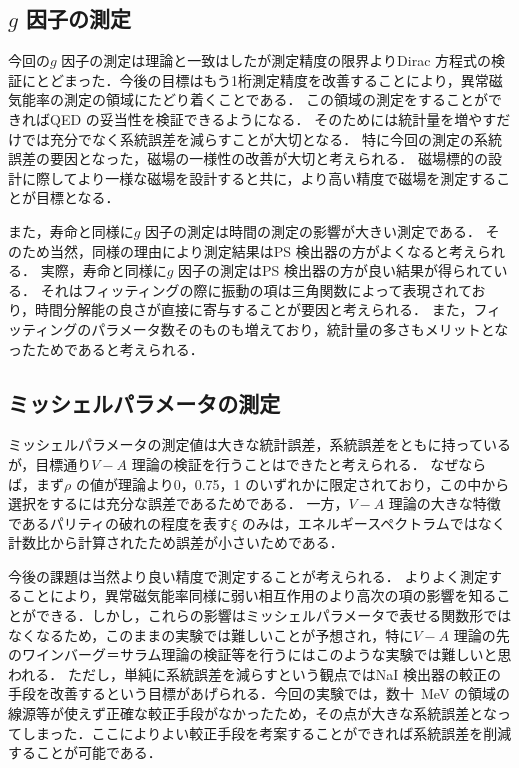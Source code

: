 \subsection{$g$ 因子の測定}
今回の$g$ 因子の測定は理論と一致はしたが測定精度の限界よりDirac 方程式の検証にとどまった．今後の目標はもう1桁測定精度を改善することにより，異常磁気能率の測定の領域にたどり着くことである．
この領域の測定をすることができればQED の妥当性を検証できるようになる．
そのためには統計量を増やすだけでは充分でなく系統誤差を減らすことが大切となる．
特に今回の測定の系統誤差の要因となった，磁場の一様性の改善が大切と考えられる．
磁場標的の設計に際してより一様な磁場を設計すると共に，より高い精度で磁場を測定することが目標となる．

また，寿命と同様に$g$ 因子の測定は時間の測定の影響が大きい測定である．
そのため当然，同様の理由により測定結果はPS 検出器の方がよくなると考えられる．
実際，寿命と同様に$g$ 因子の測定はPS 検出器の方が良い結果が得られている．
それはフィッティングの際に振動の項は三角関数によって表現されており，時間分解能の良さが直接に寄与することが要因と考えられる．
また，フィッティングのパラメータ数そのものも増えており，統計量の多さもメリットとなったためであると考えられる．

\subsection{ミッシェルパラメータの測定}
ミッシェルパラメータの測定値は大きな統計誤差，系統誤差をともに持っているが，目標通り$V-A$ 理論の検証を行うことはできたと考えられる．
なぜならば，まず$\rho$ の値が理論より0，0.75，1 のいずれかに限定されており，この中から選択をするには充分な誤差であるためである．
一方，$V-A$ 理論の大きな特徴であるパリティの破れの程度を表す$\xi$ のみは，エネルギースペクトラムではなく計数比から計算されたため誤差が小さいためである．

今後の課題は当然より良い精度で測定することが考えられる．
よりよく測定することにより，異常磁気能率同様に弱い相互作用のより高次の項の影響を知ることができる．しかし，これらの影響はミッシェルパラメータで表せる関数形ではなくなるため，このままの実験では難しいことが予想され，特に$V-A$ 理論の先のワインバーグ＝サラム理論の検証等を行うにはこのような実験では難しいと思われる．
ただし，単純に系統誤差を減らすという観点ではNaI 検出器の較正の手段を改善するという目標があげられる．今回の実験では，数十~MeV の領域の線源等が使えず正確な較正手段がなかったため，その点が大きな系統誤差となってしまった．ここによりよい較正手段を考案することができれば系統誤差を削減することが可能である．

